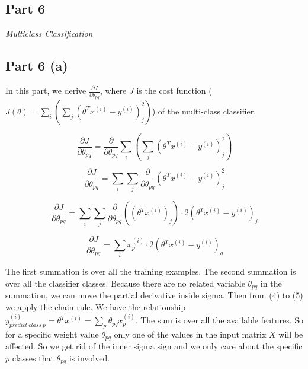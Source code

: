 \documentclass{article}
\begin{document}
\newpage
\begin{part6}

\maketitle

\newpage
\section{Part 6}
\noindent \textit{Multiclass Classification}

\subsection{Part 6 (a)}

In this part, we derive $ \frac{\partial J}{\partial \theta_{pq}} $, where $J$ is the cost function ($ J(\theta) = \sum_{i} (\sum_{j} (\theta^T x^{(i)}-y^{(i)})_j^{2}) $) of the multi-class classifier.

\begin{equation}
\frac{\partial J}{\partial \theta_{pq}} = \frac{\partial}{\partial \theta_{pq} } \sum_{i} (\sum_{j} (\theta^T x^{(i)}-y^{(i)})_j^{2})
\end{equation}

\begin{equation}
\frac{\partial J}{\partial \theta_{pq}} = \sum_{i} \sum_{j} \frac{\partial}{\partial \theta_{pq}} (\theta^T x^{(i)}-y^{(i)})_j^{2}
\end{equation}

\begin{equation}
\frac{\partial J}{\partial \theta_{pq}} = \sum_{i} \sum_{j} \frac{\partial}{\partial \theta_{pq}} ((\theta^T x^{(i)})_j) \cdotp 2 (\theta^T x^{(i)}-y^{(i)})_j
\end{equation}

\begin{equation}
\frac{\partial J}{\partial \theta_{pq}} = \sum_{i} x_p^{(i)} \cdotp 2 (\theta^T x^{(i)}-y^{(i)})_q
\end{equation}

\vspace{5mm}

The first summation is over all the training examples. The second summation is over all the classifier classes. Because there are no related variable $\theta_{pq}$ in the summation, we can move the partial derivative inside sigma. Then from (4) to (5) we apply the chain rule. We have the relationship $y_{predict\ class\ p}^{(i)} = \theta^{T}x^{(i)} = \sum_{p} \theta_{pq} x_p^{(i)}$. The sum is over all the available features. So for a specific weight value $\theta_{pq}$ only one of the values in the input matrix $X$ will be affected. So we get rid of the inner sigma sign and we only care about the specific $p$ classes that $\theta_{pq}$ is involved.


\end{part6}
\end{document}

